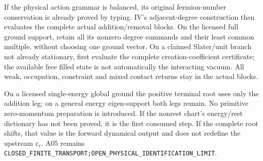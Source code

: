 \documentclass[12pt,a4paper]{article}
\begin{document}
If the physical action grammar is balanced, its original fermion-number
conservation is already proved by typing. IV's adjacent-degree construction
then evaluates the complete actual addition/removal blocks. On the licensed
full ground support, retain all its nonzero degree summands and their
least common multiple, without choosing one ground vector. On a claimed
Slater/unit branch not already stationary, first evaluate the complete
creation-coefficient certificate; the available free filled state is not
automatically the interacting vacuum. All weak, occupation, constraint and
mixed contact returns stay in the actual blocks.

On a licensed single-energy global ground the positive terminal root uses
only the addition leg; on a general energy eigen-support both legs remain.
No primitive zero-momentum preparation is introduced. If the nonrest chart's
energy/rest dictionary has not been proved, it is the first consumed step.
If the complete root shifts, that value is the forward dynamical output and
does not redefine the upstream $\varepsilon_r$. A05 remains
\texttt{CLOSED\_FINITE\_TRANSPORT;OPEN\_PHYSICAL\_IDENTIFICATION\_LIMIT}.







\end{document}
